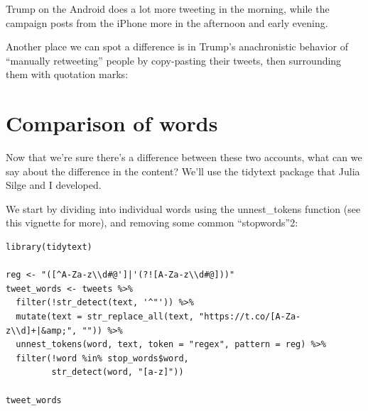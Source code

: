 \documentclass[a4paper,12pt]{article}
\begin{document}
  
  Trump on the Android does a lot more tweeting in the morning, while the campaign posts from the iPhone more in the afternoon and early evening.

Another place we can spot a difference is in Trump’s anachronistic behavior of “manually retweeting” people by copy-pasting their tweets, then surrounding them with quotation marks:


\section{Comparison of words}
Now that we’re sure there’s a difference between these two accounts, what can we say about the difference in the content? We’ll use the tidytext package that Julia Silge and I developed.

We start by dividing into individual words using the unnest_tokens function (see this vignette for more), and removing some common “stopwords”2:

\begin{lstlisting}
library(tidytext)

reg <- "([^A-Za-z\\d#@']|'(?![A-Za-z\\d#@]))"
tweet_words <- tweets %>%
  filter(!str_detect(text, '^"')) %>%
  mutate(text = str_replace_all(text, "https://t.co/[A-Za-z\\d]+|&amp;", "")) %>%
  unnest_tokens(word, text, token = "regex", pattern = reg) %>%
  filter(!word %in% stop_words$word,
         str_detect(word, "[a-z]"))

tweet_words
  \end{lstlisting}
  
\end{document}
